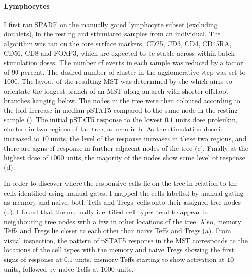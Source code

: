 \paragraph{Lymphocytes}

I first ran \gls{SPADE} on the manually gated lymphocyte subset (excluding doublets),
in the resting and stimulated samples from an individual.
The algorithm was ran on the core surface markers, CD25, CD3, CD4, CD45RA, CD56, CD8 and FOXP3,
which are expected to be stable across within-batch stimulation doses.
The number of events in each sample was reduced by a factor of 90 percent.
The desired number of cluster in the agglomerative step was set to 1000.
The layout of the resulting \gls{MST} was determined by the 
which aims to orientate the longest branch of an \gls{MST} along an arch with shorter offshoot branches hanging below.
The nodes in the tree were then coloured according to the fold increase in median pSTAT5 compared to the same node
in the resting sample ().
The initial pSTAT5 response to the lowest $0.1$ units dose proleukin, clusters in two regions of the tree,
as seen in b.
As the stimulation dose is increased to $10$ units, the level of the response increases in these two regions,
and there are signs of response in further adjacent nodes of the tree (c).
Finally at the highest dose of $1000$ units, the majority of the nodes show some level of response (d).

In order to discover where the responsive cells lie on the tree in relation to the cells identified using manual gates, I mapped the cells labelled by manual gating as memory and naive, both Teffs and Tregs, cells onto their assigned tree nodes (a).
I found that the manually identified cell types tend to appear in neighbouring tree nodes with a few in other locations of the tree.
Also, memory Teffs and Tregs lie closer to each other than naive Teffs and Tregs (a).
From visual inspection, the pattern of pSTAT5 response in the \gls{MST} corresponds to the locations of the cell types
with the memory and naive Tregs showing the first signs of response at $0.1$ units, memory Teffs starting to show activation at $10$ units,
followed by naive Teffs at $1000$ units.

